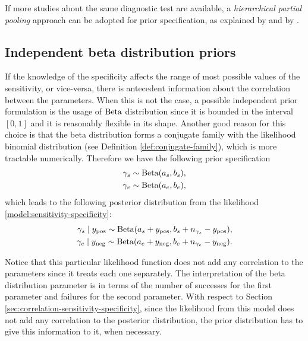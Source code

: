 If more studies about the same diagnostic test are available, a {\em
    hierarchical partial pooling} approach can be adopted for prior specification,
as explained by \textcite[p. 1272-1274]{gelman2020bayesian} and by
\textcite[p. 2-3]{guo2017bayesian}.

\subsection{Independent beta distribution priors}

If the knowledge of the specificity affects the range of most possible values
of the sensitivity, or vice-versa, there is antecedent information about the
correlation between the parameters. When this is not the case, a possible
independent prior formulation is the usage of $\operatorname{Beta}$ distribution since
it is bounded in the interval $[0,1]$ and it is reasonably flexible in its
shape.  Another good reason for this choice is that the beta distribution
forms a conjugate family with the likelihood binomial distribution (see Definition
\ref{def:conjugate-family}), which is more tractable numerically. Therefore we
have the following prior specification
\begin{equation*}
  \begin{aligned}
    \gamma_s & \sim \operatorname{Beta}(a_s, b_s), \\
    \gamma_e & \sim \operatorname{Beta}(a_e, b_e),
  \end{aligned}
\end{equation*}
which leads to the following posterior distribution from the likelihood
\eqref{model:sensitivity-specificity}:
\begin{equation*}
  \begin{aligned}
    \gamma_s \mid y_{\mathrm{pos}} \sim \operatorname{Beta}(a_s + y_{\mathrm{pos}}, b_s + n_{\gamma_s} - y_{\mathrm{pos}}), \\
    \gamma_e \mid y_{\mathrm{neg}} \sim \operatorname{Beta}(a_e + y_{\mathrm{neg}}, b_e + n_{\gamma_e} - y_{\mathrm{neg}}).
  \end{aligned}
\end{equation*}

Notice that this particular likelihood function does not add any correlation to the
parameters since it treats each one separately. The interpretation of the beta
distribution parameter is in terms of the number of successes for the first
parameter and failures for the second parameter. With respect to Section
\ref{sec:correlation-sensitivity-specificity}, since the likelihood from this
model does not add any correlation to the posterior distribution, the prior
distribution has to give this information to it, when necessary.

